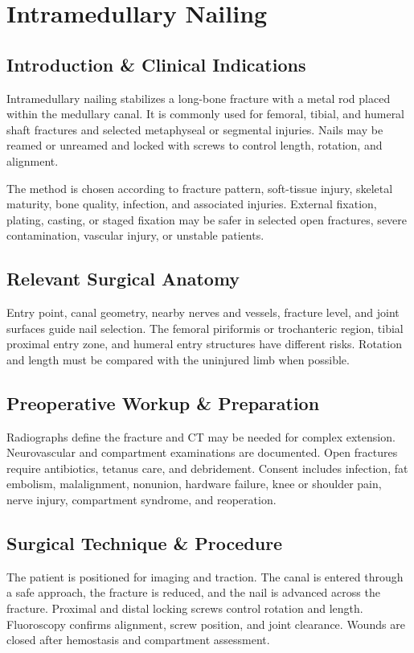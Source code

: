 \chapter{Intramedullary Nailing}

\section*{Introduction \& Clinical Indications}
Intramedullary nailing stabilizes a long-bone fracture with a metal rod placed within the medullary canal. It is commonly used for femoral, tibial, and humeral shaft fractures and selected metaphyseal or segmental injuries. Nails may be reamed or unreamed and locked with screws to control length, rotation, and alignment.

The method is chosen according to fracture pattern, soft-tissue injury, skeletal maturity, bone quality, infection, and associated injuries. External fixation, plating, casting, or staged fixation may be safer in selected open fractures, severe contamination, vascular injury, or unstable patients.

\section*{Relevant Surgical Anatomy}
Entry point, canal geometry, nearby nerves and vessels, fracture level, and joint surfaces guide nail selection. The femoral piriformis or trochanteric region, tibial proximal entry zone, and humeral entry structures have different risks. Rotation and length must be compared with the uninjured limb when possible.

\section*{Preoperative Workup \& Preparation}
Radiographs define the fracture and CT may be needed for complex extension. Neurovascular and compartment examinations are documented. Open fractures require antibiotics, tetanus care, and debridement. Consent includes infection, fat embolism, malalignment, nonunion, hardware failure, knee or shoulder pain, nerve injury, compartment syndrome, and reoperation.

\section*{Surgical Technique \& Procedure}
The patient is positioned for imaging and traction. The canal is entered through a safe approach, the fracture is reduced, and the nail is advanced across the fracture. Proximal and distal locking screws control rotation and length. Fluoroscopy confirms alignment, screw position, and joint clearance. Wounds are closed after hemostasis and compartment assessment.

